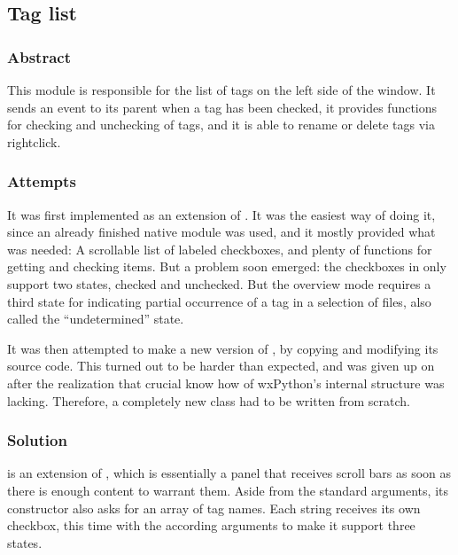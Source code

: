 \subsection{Tag list}

\subsubsection{Abstract}

This module is responsible for the list of tags on the left side of the window. It sends an event to its parent  when a tag has been checked, it provides functions for checking and unchecking of tags, and it is able to rename or delete tags via rightclick. 

\subsubsection{Attempts}

It was first implemented as an extension of . It was the easiest way of doing it, since an already finished native module was used, and it mostly provided what was needed: A scrollable list of labeled checkboxes, and plenty of functions for getting and checking items. But a problem soon emerged: the checkboxes in  only support two states, checked and unchecked. But the overview mode requires a third state for indicating partial occurrence of a tag in a selection of files, also called the ``undetermined'' state.

It was then attempted to make a new version of , by copying and modifying its source code. This turned out to be harder than expected, and was given up on after the realization that crucial know how of wxPython's   internal structure was lacking. Therefore, a completely new class had to be written from scratch.

\subsubsection{Solution}

 is an extension of , which is essentially a panel that receives scroll bars as soon as there is enough content to warrant them. Aside from the standard arguments, its constructor also asks for an array of tag names. Each string receives its own checkbox, this time with the according arguments to make it support three states.


